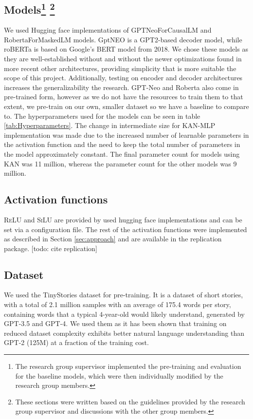 \subsection{Models\protect\footnote{\label{footnote:code} The research group supervisor implemented the pre-training and evaluation for the baseline models, which were then individually modified by the research group members.} \protect\footnote{\label{footnote:text} These sections were written based on the guidelines provided by the research group supervisor and discussions with the other group members.}}
We used Hugging face implementations of GPTNeoForCausalLM \cite{huggingfaceNEO} and RobertaForMaskedLM \cite{huggingfaceRoberta} models. GptNEO is a GPT2-based decoder model, while roBERTa is based on Google's BERT model from 2018. We chose these models as they are well-established without and without the newer optimizations found in more recent other architectures, providing simplicity that is more suitable the scope of this project. Additionally, testing on encoder and decoder architectures increases the generalizability the research. GPT-Neo and Roberta also come in pre-trained form, however as we do not have the resources to train them to that extent, we pre-train on our own, smaller dataset so we have a baseline to compare to. The hyperparameters used for the models can be seen in table \ref{tab:Hyperparameters}. The change in intermediate size for KAN-MLP implementation was made due to the increased number of learnable parameters in the activation function and the need to keep the total number of parameters in the model approximately constant. The final parameter count for models using KAN was 11 million, whereas the parameter count for the other models was 9 million.

\subsection{Activation functions}
\textsc{ReLU} and \textsc{SiLU} are provided by used hugging face implementations and can be set via a configuration file. The rest of the activation functions were implemented as described in Section \ref{sec:approach} and are available in the replication package. [todo: cite replication]

\subsection{Dataset\protect\footnotemark[5]}
We used the TinyStories \cite{Eldan2023} dataset for pre-training. It is a dataset of short stories, with a total of 2.1 million samples with an average of 175.4 words per story, containing words that a typical 4-year-old would likely understand, generated by GPT-3.5 and GPT-4. We used them as it has been shown that training on reduced dataset complexity exhibits better natural language understanding than GPT-2 (125M) at a fraction of the training cost.

